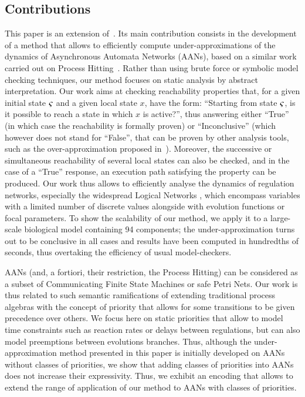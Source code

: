 \subsection*{Contributions}
This paper is an extension of~\cite{FPMR13-CS2Bio}.
Its main contribution consists in the development of a method
that allows to efficiently compute under-approximations of the dynamics
of Asynchronous Automata Networks (AANs),
based on a similar work carried out on Process Hitting~\cite{PMR12-MSCS}.
Rather than using brute force or symbolic model checking techniques,
our method focuses on static analysis by abstract interpretation.
Our work aims at checking reachability properties that,
for a given initial state $\varsigma$ and a given local state $x$,
have the form:
“Starting from state $\varsigma$, is it possible to reach
a state in which $x$ is active?”,
thus answering either “True”
(in which case the reachability is formally proven)
or “Inconclusive”
(which however does not stand for “False”, that can be proven by other analysis tools,
such as the over-approximation proposed in~\cite{PMR12-MSCS}).
Moreover, the successive or simultaneous reachability of several local states
can also be checked,
and in the case of a “True” response,
an execution path satisfying the property can be produced.
Our work thus allows to efficiently analyse the dynamics
of regulation networks,
especially the widespread Logical Networks \cite{Thomas95,deJong02},
which encompass variables with a limited number of discrete values
alongside with evolution functions or focal parameters.
To show the scalability of our method, we apply it to a
large-scale biological model containing 94 components;
the under-approximation turns out to be conclusive in
all cases and results have been computed in hundredths of seconds,
thus overtaking the efficiency of usual model-checkers.

AANs (and, a fortiori, their restriction, the Process Hitting)
can be considered as a subset of Communicating Finite State Machines
or safe Petri Nets.
Our work is thus related to such semantic ramifications
of extending traditional process algebras with the concept of priority
that allows for some transitions to be given precedence over others.
We focus here on static priorities that allow to model
time constraints such as reaction rates or delays between regulations,
but can also model preemptions between evolutions branches.
Thus, although the under-approximation method presented in this paper
is initially developed on AANs without classes of priorities,
we show that adding classes of priorities into AANs
does not increase their expressivity.
Thus, we exhibit an encoding that allows to extend the range
of application of our method to AANs with classes of priorities.

